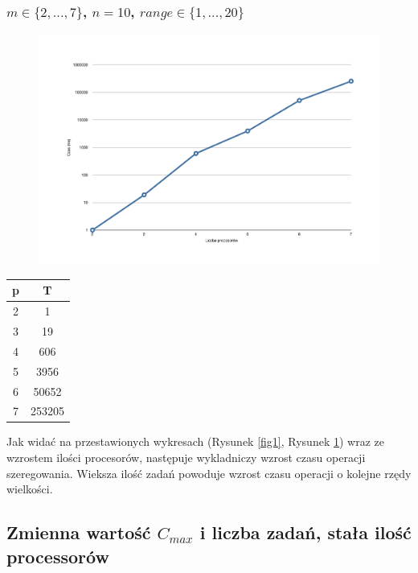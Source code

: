 \documentclass[wide,a4paper,titlepage,12pt] {article}
\begin{document}
    \subsubsection{$m \in \{2,...,7\}$, $n=10$, $range \in \{1,...,20\}$}
    \begin{figure}[htbp]
      \begin{center}
       \includegraphics[width=\textwidth]{Fig2.pdf}
        \caption{}
	\label{fig2}
      \end{center}
    \end{figure}

    \begin{center}
    \begin{tabular}{ |c|c| } \hline
      p & T \\ \hline
      2 & 1 \\ 
      3 & 19 \\
      4 & 606 \\
      5 & 3956 \\
      6 & 50652 \\
      7 & 253205 \\ \hline 
    \end{tabular}
     
    \end{center}
    
    Jak widać na przestawionych wykresach (Rysunek \ref{fig1}, Rysunek \ref{fig2}) wraz ze wzrostem ilości procesorów, następuje wykladniczy wzrost czasu operacji szeregowania. Wieksza ilość zadań powoduje wzrost czasu operacji o kolejne rzędy wielkości.  
    \newpage
    \subsection{Zmienna wartość $C_{max}$ i liczba zadań, stała ilość processorów}
\end{document}
